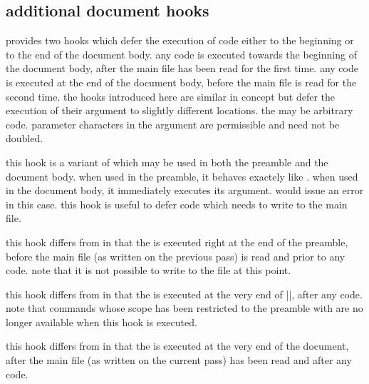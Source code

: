 \subsection[document hooks]{additional document hooks}
\label{use:pre}

\latex provides two hooks which defer the execution of code either to the beginning or to the end of the document body. any  code is executed towards the beginning of the document body, after the main  file has been read for the first time. any  code is executed at the end of the document body, before the main  file is read for the second time. the hooks introduced here are similar in concept but defer the execution of their  argument to slightly different locations. the  may be arbitrary \tex code. parameter characters in the  argument are permissible and need not be doubled.

\begin{ltxsyntax}


this hook is a variant of  which may be used in both the preamble and the document body. when used in the preamble, it behaves exactely like . when used in the document body, it immediately executes its  argument.  would issue an error in this case. this hook is useful to defer code which needs to write to the main  file.


this hook differs from  in that the  is executed right at the end of the preamble, before the main  file (as written on the previous \latex pass) is read and prior to any  code. note that it is not possible to write to the  file at this point.


this hook differs from  in that the  is executed at the very end of ||, after any  code. note that commands whose scope has been restricted to the preamble with  are no longer available when this hook is executed.


this hook differs from  in that the  is executed at the very end of the document, after the main  file (as written on the current \latex pass) has been read and after any  code.

\end{ltxsyntax}

